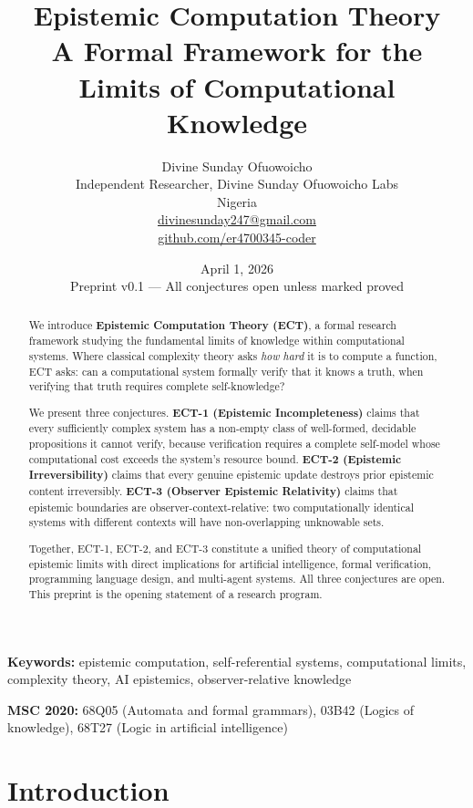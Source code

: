 \documentclass[12pt]{article}
\title{%
  \textbf{Epistemic Computation Theory}\\[6pt]
  {\large A Formal Framework for the Limits of Computational Knowledge}
}
\author{%
  Divine Sunday Ofuowoicho\\[4pt]
  \small Independent Researcher, Divine Sunday Ofuowoicho Labs\\
  \small Nigeria\\[4pt]
  \small \href{mailto:divinesunday247@gmail.com}{divinesunday247@gmail.com}\\
  \small \href{https://github.com/er4700345-coder}{github.com/er4700345-coder}
}
\date{%
  April 1, 2026\\[4pt]
  \small Preprint v0.1 --- All conjectures open unless marked proved
}
\theoremstyle{definition}
\begin{document}
\maketitle
\thispagestyle{fancy}

\begin{abstract}
We introduce \textbf{Epistemic Computation Theory (ECT)}, a formal research framework studying the fundamental limits of knowledge within computational systems. Where classical complexity theory asks \emph{how hard} it is to compute a function, ECT asks: can a computational system formally verify that it knows a truth, when verifying that truth requires complete self-knowledge?

We present three conjectures. \textbf{ECT-1 (Epistemic Incompleteness)} claims that every sufficiently complex system has a non-empty class of well-formed, decidable propositions it cannot verify, because verification requires a complete self-model whose computational cost exceeds the system's resource bound. \textbf{ECT-2 (Epistemic Irreversibility)} claims that every genuine epistemic update destroys prior epistemic content irreversibly. \textbf{ECT-3 (Observer Epistemic Relativity)} claims that epistemic boundaries are observer-context-relative: two computationally identical systems with different contexts will have non-overlapping unknowable sets.

Together, ECT-1, ECT-2, and ECT-3 constitute a unified theory of computational epistemic limits with direct implications for artificial intelligence, formal verification, programming language design, and multi-agent systems. All three conjectures are open. This preprint is the opening statement of a research program.
\end{abstract}

\vspace{1em}
\noindent\textbf{Keywords:} epistemic computation, self-referential systems, computational limits, complexity theory, AI epistemics, observer-relative knowledge

\vspace{1em}
\noindent\textbf{MSC 2020:} 68Q05 (Automata and formal grammars), 03B42 (Logics of knowledge), 68T27 (Logic in artificial intelligence)

\tableofcontents
\newpage

\section{Introduction}
\end{document}
